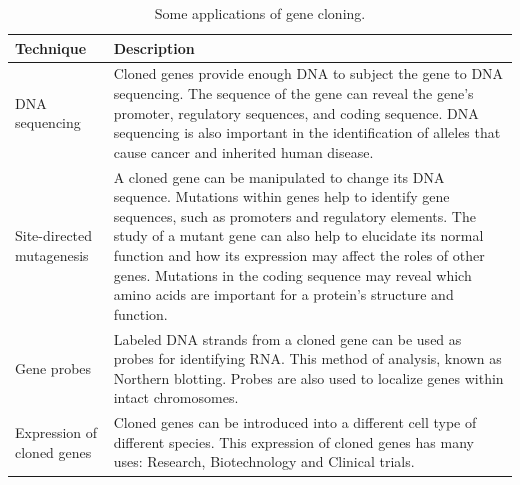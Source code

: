 \documentclass[
  ignorenonframetext,
  aspectratio=169]{beamer}
\begin{document}
\begin{frame}{}
\begin{table}
\caption{\label{tab:gene-cloning-uses}Some applications of gene cloning.}
\centering
\fontsize{6}{8}\selectfont
\begin{tabular}[t]{>{\raggedright\arraybackslash}p{8em}>{\raggedright\arraybackslash}p{42em}}
\toprule
Technique & Description\\
\midrule
DNA sequencing & Cloned genes provide enough DNA to subject the gene to DNA sequencing. The sequence of the gene can reveal the gene's promoter, regulatory sequences, and coding sequence. DNA sequencing is also important in the identification of alleles that cause cancer and inherited human disease.\\
Site-directed mutagenesis & A cloned gene can be manipulated to change its DNA sequence. Mutations within genes help to identify gene sequences, such as promoters and regulatory elements. The study of a mutant gene can also help to elucidate its normal function and how its expression may affect the roles of other genes. Mutations in the coding sequence may reveal which amino acids are important for a protein's structure and function.\\
Gene probes & Labeled DNA strands from a cloned gene can be used as probes for identifying RNA. This method of analysis, known as Northern blotting. Probes are also used to localize genes within intact chromosomes.\\
Expression of cloned genes & Cloned genes can be introduced into a different cell type of different species. This expression of cloned genes has many uses: Research, Biotechnology and Clinical trials.\\
\bottomrule
\end{tabular}
\end{table}
\end{frame}
\end{document}
